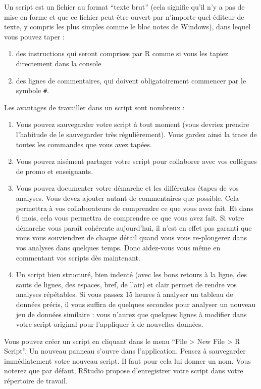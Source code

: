 \documentclass[a4paperpaper,]{article}
\providecommand{\tightlist}{%
  \setlength{\itemsep}{0pt}\setlength{\parskip}{0pt}}
\begin{document}
Un script est un fichier au format ``texte brut'' (cela signifie qu'il n'y a pas de mise en forme et que ce fichier peut-être ouvert par n'importe quel éditeur de texte, y compris les plus simples comme le bloc notes de Windows), dans lequel vous pouvez taper :

\begin{enumerate}
\def\labelenumi{\arabic{enumi}.}
\tightlist
\item
  des instructions qui seront comprises par R comme si vous les tapiez directement dans la console
\item
  des lignes de commentaires, qui doivent obligatoirement commencer par le symbole \texttt{\#}.
\end{enumerate}

Les avantages de travailler dans un script sont nombreux :

\begin{enumerate}
\def\labelenumi{\arabic{enumi}.}
\tightlist
\item
  Vous pouvez sauvegarder votre script à tout moment (vous devriez prendre l'habitude de le sauvegarder très régulièrement). Vous gardez ainsi la trace de toutes les commandes que vous avez tapées.
\item
  Vous pouvez aisément partager votre script pour collaborer avec vos collègues de promo et enseignants.
\item
  Vous pouvez documenter votre démarche et les différentes étapes de vos analyses. Vous devez ajouter autant de commentaires que possible. Cela permettra à vos collaborateurs de comprendre ce que vous avez fait. Et dans 6 mois, cela vous permettra de comprendre ce que vous avez fait. Si votre démarche vous paraît cohérente aujourd'hui, il n'est en effet pas garanti que vous vous souviendrez de chaque détail quand vous vous re-plongerez dans vos analyses dans quelques temps. Donc aidez-vous vous même en commentant vos scripts dès maintenant.
\item
  Un script bien structuré, bien indenté (avec les bons retours à la ligne, des sauts de lignes, des espaces, bref, de l'air) et clair permet de rendre vos analyses répétables. Si vous passez 15 heures à analyser un tableau de données précis, il vous suffira de quelques secondes pour analyser un nouveau jeu de données similaire : vous n'aurez que quelques lignes à modifier dans votre script original pour l'appliquer à de nouvelles données.
\end{enumerate}

Vous pouvez créer un script en cliquant dans le menu ``File \textgreater{} New File \textgreater{} R Script''. Un nouveau panneau s'ouvre dans l'application. Pensez à sauvegarder immédiatement votre nouveau script. Il faut pour cela lui donner un nom. Vous noterez que par défaut, RStudio propose d'enregistrer votre script dans votre répertoire de travail.
\end{document}
